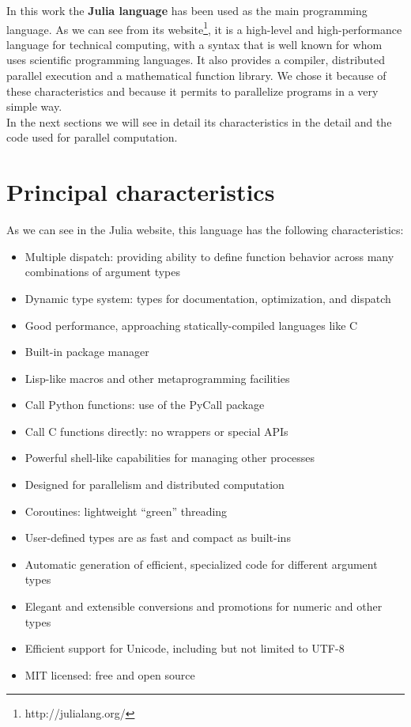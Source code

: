 In this work the \textbf{Julia language} has been used as the main programming language. As we can see from its website\footnote{http://julialang.org/}, it is a high-level and high-performance language for technical computing, with a syntax that is well known for whom uses scientific programming languages. It also provides a compiler, distributed parallel execution and a mathematical function library. We chose it because of these characteristics and because it permits to parallelize programs in a very simple way.\\

In the next sections we will see in detail its characteristics in the detail and the code used for parallel computation.

\section{Principal characteristics}\label{sec23:julia}
As we can see in the Julia website, this language has the following characteristics:
\begin{itemize}
 \item Multiple dispatch: providing ability to define function behavior across many combinations of argument types
 \item Dynamic type system: types for documentation, optimization, and dispatch
 \item Good performance, approaching statically-compiled languages like C
 \item Built-in package manager
 \item Lisp-like macros and other metaprogramming facilities
 \item Call Python functions: use of the PyCall package
 \item Call C functions directly: no wrappers or special APIs
 \item Powerful shell-like capabilities for managing other processes
 \item Designed for parallelism and distributed computation
 \item Coroutines: lightweight “green” threading
 \item User-defined types are as fast and compact as built-ins
 \item Automatic generation of efficient, specialized code for different argument types
 \item Elegant and extensible conversions and promotions for numeric and other types
 \item Efficient support for Unicode, including but not limited to UTF-8
 \item MIT licensed: free and open source
\end{itemize}


